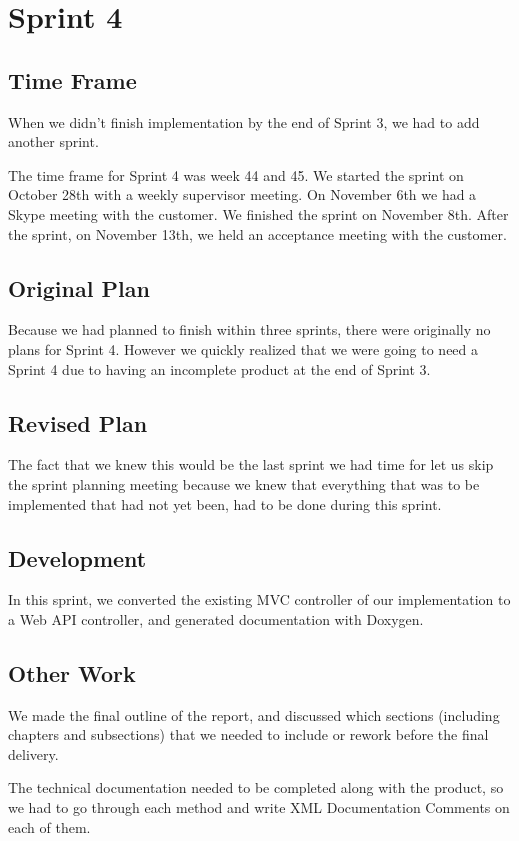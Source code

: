 \chapter{Sprint 4}

\section{Time Frame}
When we didn't finish implementation by the end of Sprint 3, we had to add another sprint.

The time frame for Sprint 4 was week 44 and 45. We started the sprint on October 28th with a weekly supervisor meeting. On November 6th we had a Skype meeting with the customer. We finished the sprint on November 8th. After the sprint, on November 13th, we held an acceptance meeting with the customer.

\section{Original Plan}
Because we had planned to finish within three sprints, there were originally no plans for Sprint 4. However we quickly realized that we were going to need a Sprint 4 due to having an incomplete product at the end of Sprint 3.

\section{Revised Plan}
The fact that we knew this would be the last sprint we had time for let us skip the sprint planning meeting because we knew that everything that was to be implemented that had not yet been, had to be done during this sprint.

\section{Development}
In this sprint, we converted the existing MVC controller of our implementation to a Web API controller, and generated documentation with Doxygen.

\section{Other Work}
We made the final outline of the report, and discussed which sections (including chapters and subsections) that we needed to include or rework before the final delivery.

The technical documentation needed to be completed along with the product, so we had to go through each method and write XML Documentation Comments on each of them.


